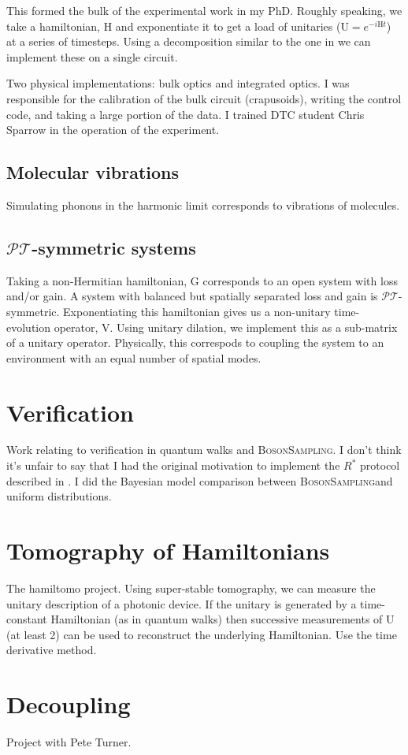 \documentclass[11pt,a4paper,twoside]{report}
\newcommand{\bosonsampling}{\textsc{BosonSampling}}
\newcommand{\rstar}{R^{*}}
\newcommand{\pt}{\(\mathcal{PT}\)}
\newcommand{\mat}[1]{\mathrm{#1}}
\begin{document}
This formed the bulk of the experimental work in my PhD. Roughly speaking, we
take a hamiltonian, \(\mat{H}\) and exponentiate it to get a load of unitaries
(\(\mat{U}=e^{-i\mat{H}t}\)) at a series of timesteps. Using a decomposition
similar to the one in \cite{reck94} we can implement these on a single
circuit.

Two physical implementations: bulk optics and integrated optics. I was
responsible for the calibration of the bulk circuit (crapusoids), writing the
control code, and taking a large portion of the data. I trained DTC student
Chris Sparrow in the operation of the experiment.

\section{Molecular vibrations}
Simulating phonons in the harmonic limit corresponds to vibrations of molecules.

\section{\pt-symmetric systems}
Taking a non-Hermitian hamiltonian, \(\mat{G}\) corresponds to an open system
with loss and/or gain. A system with balanced but spatially separated loss and
gain is \pt-symmetric. Exponentiating this hamiltonian gives us a non-unitary
time-evolution operator, \(\mat{V}\). Using unitary dilation, we implement this
as a sub-matrix of a unitary operator. Physically, this correspods to coupling
the system to an environment with an equal number of spatial modes.

\chapter{Verification}

Work relating to verification in quantum walks and \bosonsampling. I don't think
it's unfair to say that I had the original motivation to implement the
\(\rstar\) protocol described in \cite{aaronson13}. I did the Bayesian model
comparison between \bosonsampling and uniform distributions.

\chapter{Tomography of Hamiltonians}
The hamiltomo project. Using super-stable tomography, we can measure the unitary
description of a photonic device. If the unitary is generated by a time-constant
Hamiltonian (as in quantum walks) then successive measurements of \(\mat{U}\)
(at least 2) can be used to reconstruct the underlying Hamiltonian. Use the time
derivative method.

\chapter{Decoupling}

Project with Pete Turner.



\end{document}
